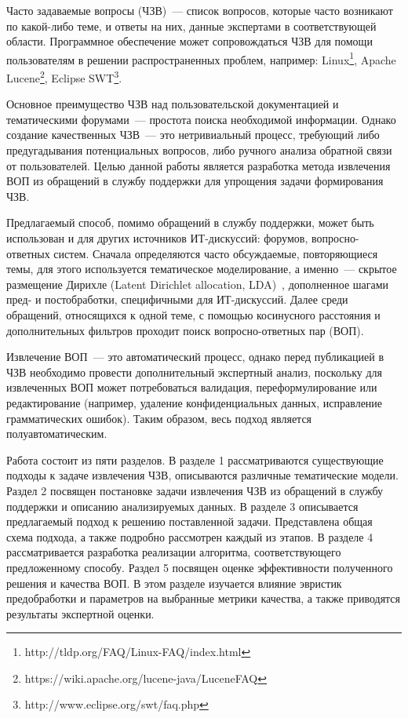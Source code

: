 \intro

Часто задаваемые вопросы (ЧЗВ)~--- список вопросов, которые часто возникают по какой-либо теме, и ответы на них, данные экспертами в соответствующей области. Программное обеспечение может сопровождаться ЧЗВ для помощи пользователям в решении распространенных проблем, например: Linux\footnote{http://tldp.org/FAQ/Linux-FAQ/index.html}, Apache Lucene\footnote{https://wiki.apache.org/lucene-java/LuceneFAQ}, Eclipse SWT\footnote{http://www.eclipse.org/swt/faq.php}.

Основное преимущество ЧЗВ над пользовательской документацией и тематическими форумами~--- простота поиска необходимой информации. Однако создание качественных ЧЗВ~--- это нетривиальный процесс, требующий либо предугадывания потенциальных вопросов, либо ручного анализа обратной связи от пользователей. Целью данной работы является разработка метода извлечения ВОП из обращений в службу поддержки для упрощения задачи формирования ЧЗВ.

Предлагаемый способ, помимо обращений в службу поддержки, может быть использован и для других источников ИТ-дискуссий: форумов, вопросно-ответных систем. Сначала определяются часто обсуждаемые, повторяющиеся темы, для этого используется тематическое моделирование, а именно~--- скрытое размещение Дирихле (Latent Dirichlet allocation, LDA)~\cite{LDA}, дополненное шагами пред- и постобработки, специфичными для ИТ-дискуссий. Далее среди обращений, относящихся к одной теме, с помощью косинусного расстояния и дополнительных фильтров проходит поиск вопросно-ответных пар (ВОП). 


Извлечение ВОП~--- это автоматический процесс, однако перед публикацией в ЧЗВ необходимо провести дополнительный экспертный анализ, поскольку для извлеченных ВОП может потребоваться валидация, переформулирование или редактирование (например, удаление конфиденциальных данных, исправление грамматических ошибок). Таким образом, весь подход является полуавтоматическим. 

Работа состоит из пяти разделов. В разделе 1 рассматриваются существующие подходы к задаче извлечения ЧЗВ, описываются различные тематические модели. Раздел 2 посвящен постановке задачи извлечения ЧЗВ из обращений в службу поддержки и описанию анализируемых данных. В разделе 3 описывается предлагаемый подход к решению поставленной задачи. Представлена общая схема подхода, а также подробно рассмотрен каждый из этапов. В разделе 4 рассматривается разработка реализации алгоритма, соответствующего предложенному способу. Раздел 5 посвящен оценке эффективности полученного решения и качества ВОП. В этом разделе изучается влияние эвристик предобработки и параметров на выбранные метрики качества, а также приводятся результаты экспертной оценки.